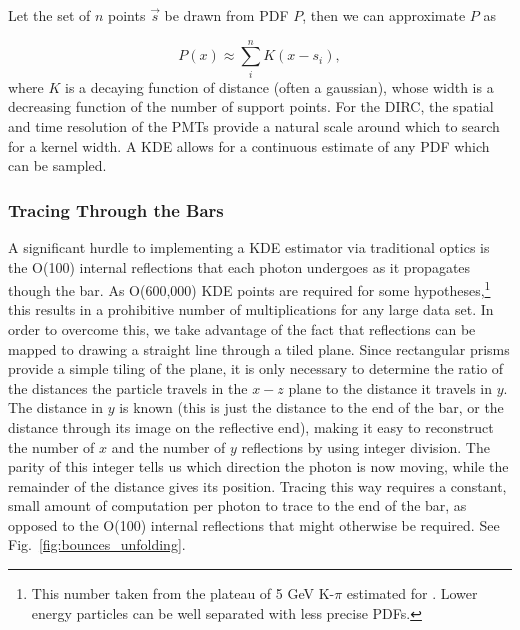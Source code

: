 Let the set of $n$ points $\vec{s}$ be drawn from PDF $P$, then we can approximate $P$  as

\begin{equation}
P(x) \approx \sum_{i}^{n} K(x - s_{i}),
\label{eq:kernel_form}
\end{equation}
where $K$ is a decaying function of distance (often a gaussian), whose width is a decreasing function of the number of support points.  For the \gluex DIRC, the spatial and time resolution of the PMTs provide a natural scale around which to search for a kernel width.  A KDE allows for a continuous estimate of any PDF which can be sampled.

\subsubsection*{Tracing Through the Bars}
A significant hurdle to implementing a KDE estimator via traditional optics is the O(100) internal reflections that each photon undergoes as it propagates though the bar.  As O(600,000) KDE points are required for some hypotheses,\footnote{This number taken from the plateau of 5 GeV K-$\pi$ estimated for \gluex.  Lower energy particles can be well separated with less precise PDFs.} this results in a prohibitive number of multiplications for any large data set.  In order to overcome this, we take advantage of the fact that reflections can be mapped to drawing a straight line through a tiled plane.  Since rectangular prisms provide a simple tiling of the plane, it is only necessary to determine the ratio of the distances the particle travels in the $x-z$ plane to the distance it travels in $y$.  The distance in $y$ is known (this is just the distance to the end of the bar, or the distance through its image on the reflective end), making it easy to reconstruct the number of $x$ and the number of $y$ reflections by using integer division.  The parity of this integer tells us which direction the photon is now moving, while the remainder of the distance gives its position.  Tracing this way requires a constant, small amount of computation per photon to trace to the end of the bar, as opposed to the O(100) internal reflections that might otherwise be required.  See Fig.~\ref{fig:bounces_unfolding}.

